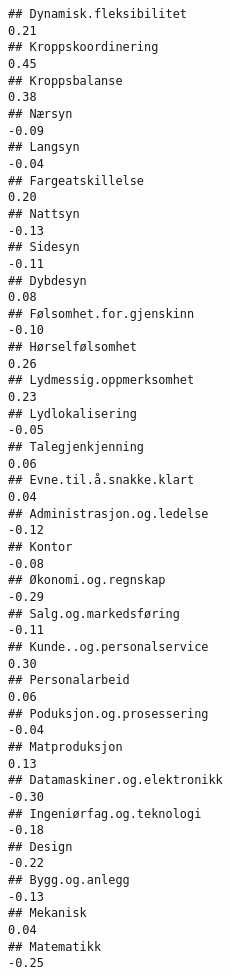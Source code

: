 \documentclass[
]{article}
\begin{document}
\begin{verbatim}
## Dynamisk.fleksibilitet                                                            0.21
## Kroppskoordinering                                                                0.45
## Kroppsbalanse                                                                     0.38
## Nærsyn                                                                           -0.09
## Langsyn                                                                          -0.04
## Fargeatskillelse                                                                  0.20
## Nattsyn                                                                          -0.13
## Sidesyn                                                                          -0.11
## Dybdesyn                                                                          0.08
## Følsomhet.for.gjenskinn                                                          -0.10
## Hørselfølsomhet                                                                   0.26
## Lydmessig.oppmerksomhet                                                           0.23
## Lydlokalisering                                                                  -0.05
## Talegjenkjenning                                                                  0.06
## Evne.til.å.snakke.klart                                                           0.04
## Administrasjon.og.ledelse                                                        -0.12
## Kontor                                                                           -0.08
## Økonomi.og.regnskap                                                              -0.29
## Salg.og.markedsføring                                                            -0.11
## Kunde..og.personalservice                                                         0.30
## Personalarbeid                                                                    0.06
## Poduksjon.og.prosessering                                                        -0.04
## Matproduksjon                                                                     0.13
## Datamaskiner.og.elektronikk                                                      -0.30
## Ingeniørfag.og.teknologi                                                         -0.18
## Design                                                                           -0.22
## Bygg.og.anlegg                                                                   -0.13
## Mekanisk                                                                          0.04
## Matematikk                                                                       -0.25

\end{verbatim}
\end{document}
